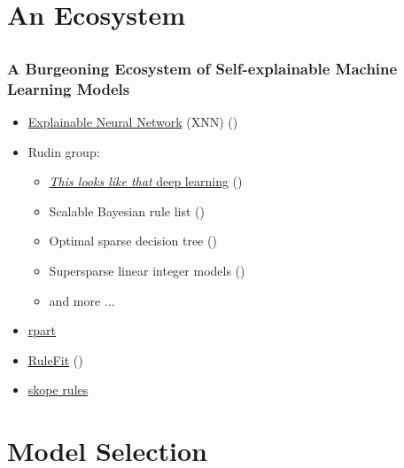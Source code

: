 \documentclass[11pt,aspectratio=169,hyperref={colorlinks}]{beamer}
\begin{document}
	\section{An Ecosystem}
			
		\subsection*{}
		
		\begin{frame}
		
			\frametitle{A Burgeoning Ecosystem of Self-explainable Machine Learning Models}		
			
			\begin{itemize}
				\item \href{https://www.mdpi.com/2078-2489/11/3/137}{Explainable Neural Network} (XNN) (\cite{wf_xnn})
				\item Rudin group: 
				\begin{itemize}
					\item \href{https://www.youtube.com/watch?v=k3IQnRsl9U4}{\textit{This looks like that} deep learning} (\cite{this_looks_like_that})
					\item Scalable Bayesian rule list (\cite{sbrl}) 
					\item Optimal sparse decision tree (\cite{osdt})
					\item Supersparse linear integer models (\cite{slim})
					\item and more ... 
				\end{itemize}
				\item \href{https://github.com/scikit-learn-contrib/skope-rules}{rpart}
				\item \href{https://christophm.github.io/interpretable-ml-book/rulefit.html}{RuleFit} (\cite{rulefit})
				\item \href{https://github.com/scikit-learn-contrib/skope-rules}{skope rules}
			\end{itemize}
		
		\end{frame}


	\section{Model Selection}
\end{document}
